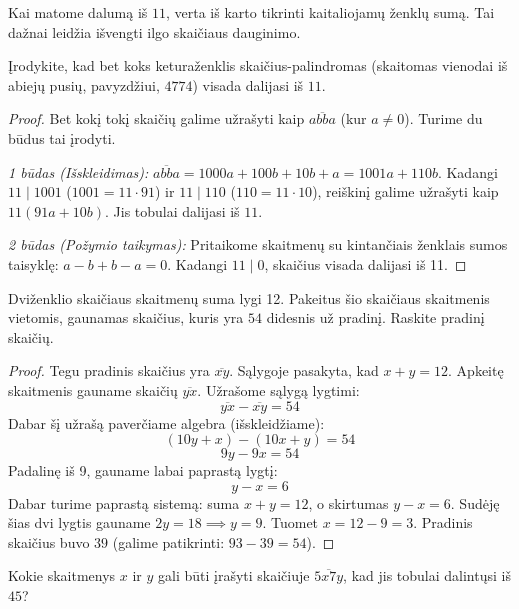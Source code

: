 \documentclass[11pt,a4paper]{scrartcl}
\begin{document}
\begin{remark*}
Kai matome dalumą iš $11$, verta iš karto tikrinti kaitaliojamų ženklų sumą. Tai dažnai leidžia išvengti ilgo skaičiaus dauginimo.
\end{remark*}

\begin{example}
Įrodykite, kad bet koks keturaženklis skaičius-palindromas (skaitomas vienodai iš abiejų pusių, pavyzdžiui, $4774$) visada dalijasi iš $11$.
\end{example}

\begin{proof}
Bet kokį tokį skaičių galime užrašyti kaip $\overline{abba}$ (kur $a \neq 0$).
Turime du būdus tai įrodyti.

\textit{1 būdas (Išskleidimas):} 
$\overline{abba} = 1000a + 100b + 10b + a = 1001a + 110b$.
Kadangi $11 \mid 1001$ ($1001 = 11 \cdot 91$) ir $11 \mid 110$ ($110 = 11 \cdot 10$), reiškinį galime užrašyti kaip $11(91a + 10b)$. Jis tobulai dalijasi iš $11$.

\textit{2 būdas (Požymio taikymas):} 
Pritaikome skaitmenų su kintančiais ženklais sumos taisyklę:
$a - b + b - a = 0$. Kadangi $11 \mid 0$, skaičius visada dalijasi iš 11.
\end{proof}


\begin{example}
Dviženklio skaičiaus skaitmenų suma lygi 12. Pakeitus šio skaičiaus skaitmenis vietomis, gaunamas skaičius, kuris yra $54$ didesnis už pradinį. Raskite pradinį skaičių.
\end{example}

\begin{proof}
Tegu pradinis skaičius yra $\overline{xy}$. Sąlygoje pasakyta, kad $x+y = 12$.
Apkeitę skaitmenis gauname skaičių $\overline{yx}$.
Užrašome sąlygą lygtimi:
\[ \overline{yx} - \overline{xy} = 54 \]
Dabar šį užrašą paverčiame algebra (išskleidžiame):
\[ (10y + x) - (10x + y) = 54 \]
\[ 9y - 9x = 54 \]
Padalinę iš 9, gauname labai paprastą lygtį:
\[ y - x = 6 \]
Dabar turime paprastą sistemą: suma $x+y = 12$, o skirtumas $y-x = 6$.
Sudėję šias dvi lygtis gauname $2y = 18 \implies y = 9$.
Tuomet $x = 12 - 9 = 3$.
Pradinis skaičius buvo $39$ (galime patikrinti: $93 - 39 = 54$).
\end{proof}


\begin{example}
Kokie skaitmenys $x$ ir $y$ gali būti įrašyti skaičiuje $\overline{5x7y}$, kad jis tobulai dalintųsi iš $45$?
\end{example}
\end{document}
